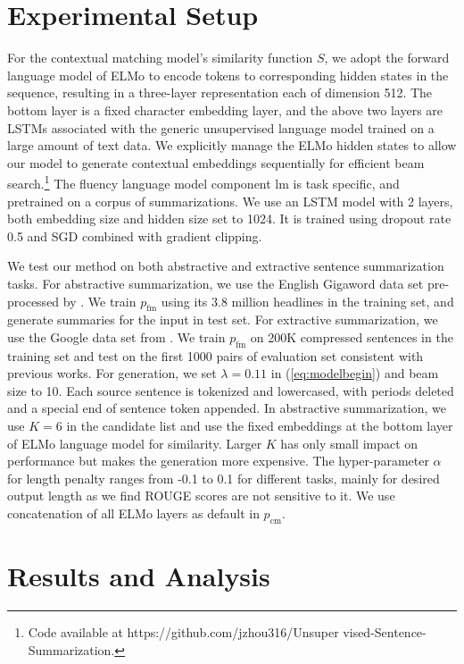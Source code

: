 \documentclass[11pt,a4paper]{article}
\newcommand{\ps}{p_{\mathrm{cm}}}
\newcommand{\pl}{p_{\mathrm{fm}}}
\begin{document}
\section{Experimental Setup}
For the contextual matching model's similarity function $S$, we adopt the forward language model of ELMo \cite{peters2018deep} to encode tokens to corresponding hidden states in the sequence, resulting in a three-layer representation each of dimension 512. The bottom layer is a fixed character embedding layer, and the above two layers are LSTMs associated with the generic unsupervised language model trained on a large amount of text data.
We explicitly manage the ELMo hidden states to allow our model to generate contextual embeddings sequentially for efficient beam search.\footnote{Code available at https://github.com/jzhou316/Unsuper
vised-Sentence-Summarization.}
The fluency language model component $\mathrm{lm}$ is task specific, and pretrained on a corpus of summarizations. We use an LSTM model with 2 layers, both embedding size and hidden size set to 1024. It is trained using dropout rate 0.5 and SGD combined with gradient clipping.

We test our method on both abstractive and extractive sentence summarization tasks.
For abstractive summarization, we use the English Gigaword data set pre-processed by \citet{rush2015neural}. 
We train $\pl$ using its 3.8 million headlines in the training set, and generate summaries for the input in test set.
For extractive summarization, we use the Google data set from \citet{filippova2013overcoming}. We train $\pl$ on 200K compressed sentences in the training set and test on the first 1000 pairs of evaluation set consistent with previous works.
For generation, we set $\lambda=0.11$ in (\ref{eq:modelbegin}) and beam size to 10.
Each source sentence is tokenized and lowercased, with periods deleted and a special end of sentence token appended. In abstractive summarization, we use $K=6$ in the candidate list and use the fixed embeddings at the bottom layer of ELMo language model for similarity.
Larger $K$ has only small impact on performance but makes the generation more expensive. The hyper-parameter $\alpha$ for length penalty ranges from -0.1 to 0.1 for different tasks, mainly for desired output length as we find ROUGE scores are not sensitive to it.
We use concatenation of all ELMo layers as default in $\ps$.




\section{Results and Analysis}
\end{document}
